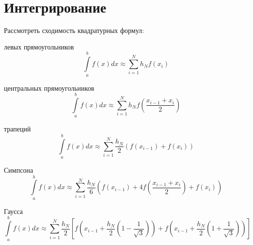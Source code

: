 \section{Интегрирование}

Рассмотреть сходимость квадратурных формул:

левых прямоугольников
$$
	\int\limits_a^b f(x) dx \approx \sum\limits_{i=1}^N h_N f(x_i)
$$

центральных прямоугольников
$$
	\int\limits_a^b f(x) dx \approx \sum\limits_{i=1}^N h_N f(\frac{x_{i-1} + x_i}{2})
$$

трапеций
$$
	\int\limits_a^b f(x) dx \approx \sum\limits_{i=1}^N \frac{h_N}{2} \left( f(x_{i-1}) + f(x_i) \right)
$$

Симпсона
$$
	\int\limits_a^b f(x) dx \approx \sum\limits_{i=1}^N \frac{h_N}{6} \left( f(x_{i-1}) + 4f(\frac{x_{i-1} + x_i}{2}) + f(x_i) \right)
$$

Гаусса
$$
	\int\limits_a^b f(x) dx \approx \sum\limits_{i=1}^N \frac{h_N}{2} \left[ f\left( x_{i-1} + \frac{h_N}{2}\left( 1 - \frac{1}{\sqrt{3}} \right)\right) +  f\left( x_{i-1} + \frac{h_N}{2}\left( 1 + \frac{1}{\sqrt{3}} \right)\right) \right]
$$
